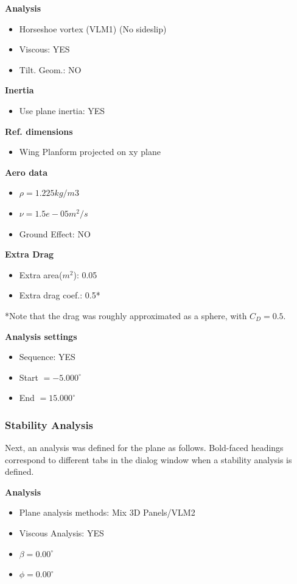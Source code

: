\documentclass[]{auvsi_doc}
\begin{document}
\textbf{Analysis}
\begin{itemize}
	\item Horseshoe vortex (VLM1) (No sideslip)
	\item Viscous: YES
	\item Tilt. Geom.: NO
\end{itemize}

\textbf{Inertia}
\begin{itemize}
	\item Use plane inertia: YES
\end{itemize}

\textbf{Ref. dimensions}
\begin{itemize}
	\item Wing Planform projected on xy plane
\end{itemize}

\textbf{Aero data}
\begin{itemize}
	\item $\rho = 1.225 kg/m3$
	\item $\nu = 1.5e-05 m^2/s$
	\item Ground Effect: NO
\end{itemize}

\textbf{Extra Drag}
\begin{itemize}
	\item Extra area($m^2$): 0.05
	\item Extra drag coef.: 0.5*
\end{itemize}

*Note that the drag was roughly approximated as a sphere, with $C_D=0.5$.

\textbf{Analysis settings}
\begin{itemize}
	\item Sequence: YES
	\item Start $=-5.000^\circ$
	\item End $=15.000^\circ$
\end{itemize}

\subsubsection{Stability Analysis}
Next, an analysis was defined for the plane as follows. Bold-faced headings correspond to different tabs in the dialog window when a stability analysis is defined.

\textbf{Analysis}
\begin{itemize}
	\item Plane analysis methods: Mix 3D Panels/VLM2
	\item Viscous Analysis: YES
	\item $\beta = 0.00^\circ$
	\item $\phi = 0.00^\circ$
\end{itemize}
\end{document}
